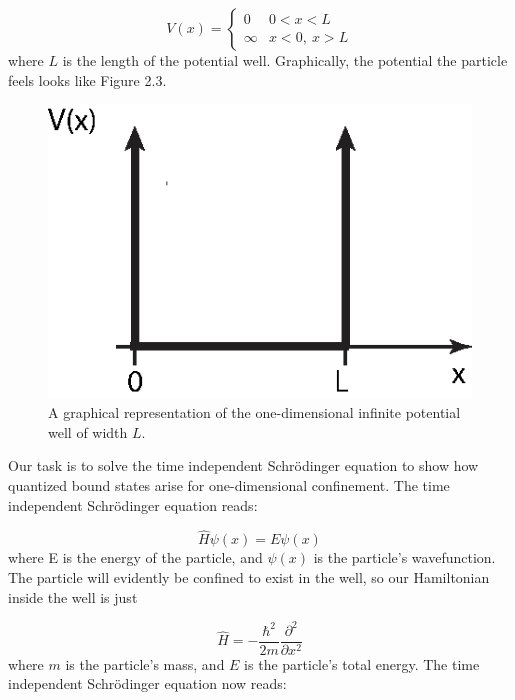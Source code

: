 \[ V(x) = \begin{cases} 
      0 & 0 < x < L \\
      \infty &  x<0, ~x > L 
   \end{cases}
\]
where $L$ is the length of the potential well. Graphically, the potential the particle feels looks like Figure 2.3.

\begin{figure}[h!]
\label{infp}
\centering
\includegraphics[width = .6\textwidth]{infpotential.eps}
\caption{\doublespacing A graphical representation of the one-dimensional infinite potential well of width $L$.}
\end{figure}

Our task is to solve the time independent Schr\"{o}dinger equation to show how quantized bound states arise for one-dimensional confinement. The time independent Schr\"{o}dinger equation reads:

\begin{equation}
\hat{H} \psi(x) = E\psi(x)
\end{equation}
where E is the energy of the particle, and $\psi(x)$ is the particle's wavefunction. The particle will evidently be confined to exist in the well, so our Hamiltonian inside the well is just

\begin{equation}
\hat{H} = - \frac{\hbar^2}{2m} \frac{\partial^2}{\partial x^2}
\label{hamil}
\end{equation}
where $m$ is the particle's mass, and $E$ is the particle's  total energy. The time independent Schr\"{o}dinger equation now reads:

